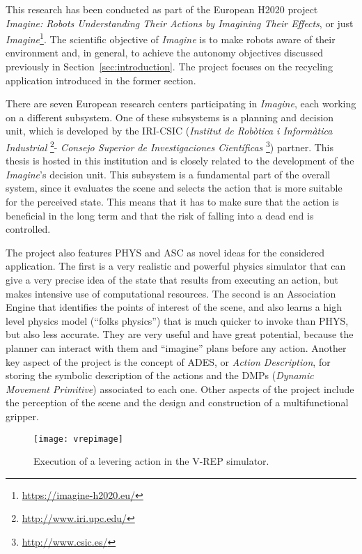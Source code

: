 \documentclass[../root.tex]{subfiles}
\begin{document}
This research has been conducted as part of the European H2020 project
\emph{Imagine: Robots Understanding Their Actions by Imagining Their Effects},
or just \emph{Imagine}\footnote{\url{https://imagine-h2020.eu/}}. The scientific
objective of \emph{Imagine} is to make robots aware of their environment
and, in general, to achieve the autonomy objectives discussed
previously in
Section~\ref{sec:introduction}. The project focuses on the recycling
application introduced in the former section.

There are seven European research centers participating in \emph{Imagine},
each working on a different subsystem. One of these subsystems is a
planning and decision unit, which is developed by the IRI-CSIC 
(\emph{Institut de Rob\`otica i Inform\`atica Industrial}%
\footnote{\url{http://www.iri.upc.edu/}}-%
\emph{Consejo Superior de Investigaciones Cient\'ificas}%
\footnote{\url{http://www.csic.es/}}) partner. This thesis is hosted
in this institution and is closely
related to the development of the \emph{Imagine}'s decision unit.
This subsystem is a fundamental part of the overall system, since it
evaluates the scene and selects the action that is more suitable for
the perceived state. This means that it has to make sure that the action
is beneficial in the long term and that the risk of falling into a
dead end is controlled.

The project also features PHYS and ASC as novel ideas for the considered application.
The first is a very realistic and
powerful physics simulator that can give a very precise idea of the state that results
from executing an action, but makes intensive use of
computational resources. The second is an Association Engine that identifies the
points of interest
of the scene, and also learns a high level physics model (``folks physics'')
that is much quicker to invoke than PHYS, but also less accurate.
They are very useful and have great potential, because the planner can interact
with them and ``imagine'' plans before any action.
Another key aspect of the project is the concept
of ADES, or \emph{Action Description}, for storing the symbolic description
of the actions and the DMPs (\emph{Dynamic Movement Primitive}) associated to
each one. Other aspects of the project include the perception of the scene
and the design and construction of a multifunctional gripper.

\begin{wrapfigure}{L}{0.5\columnwidth}
	\centering
	\texttt{[image: vrepimage]}
	\caption{Execution of a levering action in the V-REP simulator.}
	\label{fig:vrepimage}
\end{wrapfigure}
\end{document}
